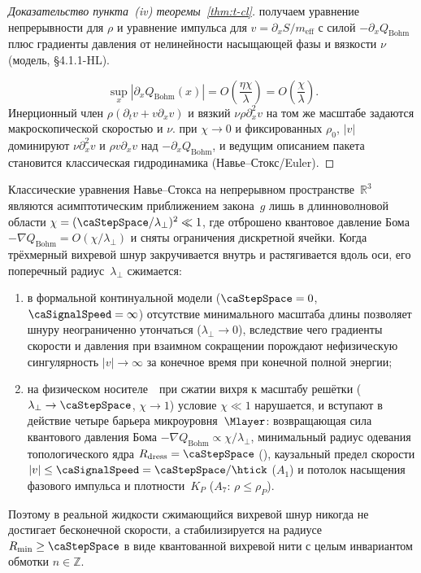 \begin{proof}[Доказательство пункта~\emph{(iv)} теоремы~\ref{thm:t-cl}]
получаем уравнение непрерывности для $\rho$ и уравнение импульса для $v=\partial_x S/m_{\mathrm{eff}}$
с силой $-\partial_x Q_{\mathrm{Bohm}}$ плюс градиенты давления от нелинейности насыщающей фазы и вязкости $\nu$
(модель, \S4.1.1-HL).

\[
  \sup_x|\partial_x Q_{\mathrm{Bohm}}(x)|=O\!\left(\frac{\eta\chi}{\lambda}\right)=O\!\left(\frac{\chi}{\lambda}\right).
\]
Инерционный член $\rho(\partial_t v+v\partial_x v)$ и вязкий $\nu\rho\partial_x^2 v$ на том же масштабе
задаются макроскопической скоростью и $\nu$.
\phence при $\chi\to 0$ и фиксированных $\rho_0$, $|v|$ доминируют $\nu\partial_x^2 v$ и $\rho v\partial_x v$
над $-\partial_x Q_{\mathrm{Bohm}}$, и ведущим описанием пакета становится классическая гидродинамика (Навье--Стокс/Euler).
\end{proof}

\begin{corollary}
\label{cor:navier-stokes-regularization}
Классические уравнения Навье--Стокса на непрерывном пространстве~$\mathbb{R}^3$ являются асимптотическим приближением закона~$g$ лишь в длинноволновой области $\chi = (\caStepSpace/\lambda_\perp)^2 \ll 1$, где отброшено квантовое давление Бома $-\nabla Q_{\mathrm{Bohm}} = O(\chi/\lambda_\perp)$ и сняты ограничения дискретной ячейки.
Когда трёхмерный вихревой шнур закручивается внутрь и растягивается вдоль оси, его поперечный радиус~$\lambda_\perp$ сжимается:
\begin{enumerate}[noitemsep]
\item в формальной континуальной модели ($\caStepSpace = 0$, $\caSignalSpeed = \infty$) отсутствие минимального масштаба длины позволяет шнуру неограниченно утончаться ($\lambda_\perp\to 0$), вследствие чего градиенты скорости и давления при взаимном сокращении порождают нефизическую сингулярность $|v|\to\infty$ за конечное время при конечной полной энергии;
\item на физическом носителе~\latGCKshort\ при сжатии вихря к масштабу решётки ($\lambda_\perp\to\caStepSpace$, $\chi\to 1$) условие $\chi\ll 1$ нарушается, и вступают в действие четыре барьера микроуровня~$\Mlayer$: возвращающая сила квантового давления Бома $-\nabla Q_{\mathrm{Bohm}}\propto \chi/\lambda_\perp$, минимальный радиус одевания топологического ядра $R_{\mathrm{dress}} = \caStepSpace$ (), каузальный предел скорости $|v|\le\caSignalSpeed = \caStepSpace/\htick$ ($A_1$) и потолок насыщения фазового импульса и плотности~$K_P$ ($A_7$: $\rho\le\rho_P$).
\end{enumerate}
Поэтому в реальной жидкости сжимающийся вихревой шнур никогда не достигает бесконечной скорости, а стабилизируется на радиусе $R_{\min}\ge\caStepSpace$ в виде квантованной вихревой нити с целым инвариантом обмотки $n\in\mathbb{Z}$.
\end{corollary}

